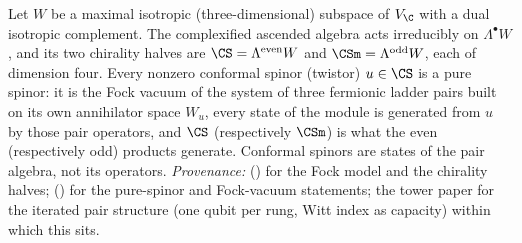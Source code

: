 Let $W$ be a maximal isotropic (three-dimensional) subspace of $V_{\C}$ with a dual isotropic complement. The complexified ascended algebra acts irreducibly on $\Lambda^{\bullet}W$, and its two chirality halves are $\CS = \Lambda^{\mathrm{even}}W$ and $\CSm = \Lambda^{\mathrm{odd}}W$, each of dimension four. Every nonzero conformal spinor (twistor) $u \in \CS$ is a pure spinor: it is the Fock vacuum of the system of three fermionic ladder pairs built on its own annihilator space $W_{u}$, every state of the module is generated from $u$ by those pair operators, and $\CS$ (respectively $\CSm$) is what the even (respectively odd) products generate. Conformal spinors are states of the pair algebra, not its operators. \emph{Provenance:} \cite[Thm.~3.1]{ButlerT9} () for the Fock model and the chirality halves; \cite[Thm.~5.3]{ButlerT9} () for the pure-spinor and Fock-vacuum statements; the tower paper \cite[Thms.~4.2, 4.3]{ButlerT3} for the iterated pair structure (one qubit per rung, Witt index as capacity) within which this sits.
